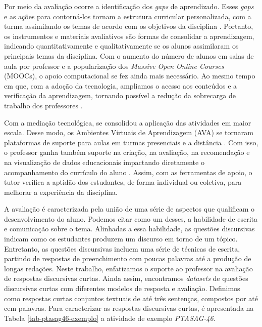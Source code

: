Por meio da avaliação ocorre a identificação dos \textit{gaps} de aprendizado. Esses \textit{gaps} e as ações para contorná-los tornam a estrutura curricular personalizada, com a turma assimilando os temas de acordo com os objetivos da disciplina \cite{biggs1998}. Portanto, os instrumentos e materiais avaliativos são formas de consolidar a aprendizagem, indicando quantitativamente e qualitativamente se os alunos assimilaram os principais temas da disciplina. Com o aumento do número de alunos em salas de aula por professor e a popularização dos \textit{Massive Open Online Courses} (MOOCs), o apoio computacional se fez ainda mais necessário. Ao mesmo tempo em que, com a adoção da tecnologia, ampliamos o acesso aos conteúdos e a verificação da aprendizagem, tornando possível a redução da sobrecarga de trabalho dos professores \cite{dunlap2005}.

Com a mediação tecnológica, se consolidou a aplicação das atividades em maior escala. Desse modo, os Ambientes Virtuais de Aprendizagem (AVA) \cite{maquine2020} se tornaram plataformas de suporte para aulas em turmas presenciais e a distância \cite{raes2020}. Com isso, o professor ganha também suporte na criação, na avaliação, na recomendação e na visualização de dados educacionais impactando diretamente o acompanhamento do currículo do aluno \cite{paiva2012}. Assim, com as ferramentas de apoio, o tutor verifica a aptidão dos estudantes, de forma individual ou coletiva, para melhorar a experiência da disciplina.

A avaliação é caracterizada pela união de uma série de aspectos que qualificam o desenvolvimento do aluno. Podemos citar como um desses, a habilidade de escrita e comunicação sobre o tema. Alinhadas a essa habilidade, as questões discursivas indicam como os estudantes produzem um discurso em torno de um tópico. Entretanto, as questões discursivas incluem uma série de técnicas de escrita, partindo de respostas de preenchimento com poucas palavras até a produção de longas redações. Neste trabalho, enfatizamos o suporte ao professor na avaliação de respostas discursivas curtas. Ainda assim, encontramos \textit{datasets} de questões discursivas curtas com diferentes modelos de resposta e avaliação. Definimos como respostas curtas conjuntos textuais de até três sentenças, compostos por até cem palavras. Para caracterizar as respostas discursivas curtas, é apresentada na Tabela \ref{tab-ptasag46-exemplo} a atividade de exemplo \textit{PTASAG-46}.

